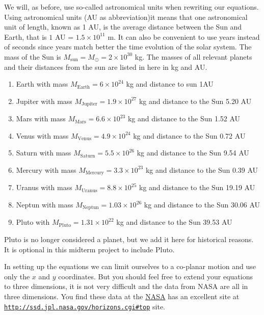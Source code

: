 \documentclass[%
oneside,                 %
final,                   %
10pt]{article}
\begin{document}
We will, as before, use so-called astronomical units when rewriting our equations. 
Using astronomical units (AU as abbreviation)it means that 
one astronomical unit of length, known as 1 AU, is the average distance between the Sun and Earth, that is
$1$ AU = $1.5\times 10^{11}$ m.  It can also be convenient to use years instead of seconds since years match
better the time evolution of the solar system. The mass of the Sun is $M_{\mathrm{sun}}=M_{\odot}=2\times 10^{30}$ kg. The masses of all relevant planets and their distances from the sun are listed in here in kg and AU.

\begin{enumerate}
\item Earth with mass  $M_{\mathrm{Earth}}=6\times 10^{24}$ kg and distance to sun  1AU

\item Jupiter with mass  $M_{\mathrm{Jupiter}}=1.9\times 10^{27}$ kg and distance to the Sun 5.20 AU

\item Mars  with mass $M_{\mathrm{Mars}}=6.6\times 10^{23}$ kg and distance to the Sun 1.52 AU 

\item Venus with mass $M_{\mathrm{Venus}}=4.9\times 10^{24}$ kg and distance to the Sun 0.72 AU 

\item Saturn with mass $M_{\mathrm{Saturn}}=5.5\times 10^{26}$ kg and distance to the Sun 9.54 AU 

\item Mercury with mass $M_{\mathrm{Mercury}}=3.3\times 10^{23}$ kg and distance to the Sun 0.39 AU

\item Uranus  with mass $M_{\mathrm{Uranus}}=8.8\times 10^{25}$ kg and distance to the Sun 19.19 AU

\item Neptun with mass $M_{\mathrm{Neptun}}=1.03\times 10^{26}$ kg and distance to the Sun 30.06 AU

\item Pluto with  $M_{\mathrm{Pluto}}=1.31\times 10^{22}$ kg  and distance to the Sun 39.53 AU
\end{enumerate}

\noindent
Pluto is no longer considered a planet, but we add it here for
historical reasons. It is optional in this midterm project to include
Pluto.

In setting up the equations we can limit ourselves to a co-planar
motion and use only the $x$ and $y$ coordinates. But you should feel
free to extend your equations to three dimensions, it is not very
difficult and the data from NASA are all in three dimensions.
You find these data at the 
\href{{http://www.nasa.gov/index.html}}{NASA} has an excellent site at \href{{http://ssd.jpl.nasa.gov/horizons.cgi#top}}{\nolinkurl{http://ssd.jpl.nasa.gov/horizons.cgi\#top}} site.
\end{document}
